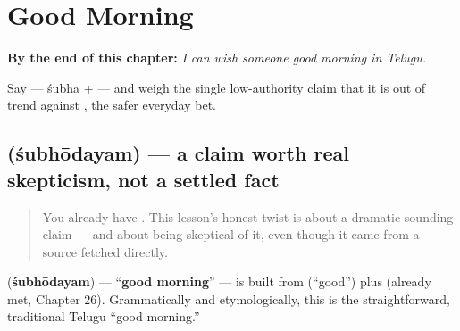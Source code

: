 
\chapter{Good Morning}
\label{ch:te-good-morning}

\begin{chapteropening}
\textbf{By the end of this chapter:} \emph{I can wish someone good morning in Telugu.}

Say  — śubha +  — and weigh the single low-authority claim that it is out of trend against , the safer everyday bet.
\end{chapteropening}

\section[\texorpdfstring{\te{శుభోదయం} (śubhōdayam)}{శుభోదయం (śubhōdayam)}]{ (śubhōdayam) — a claim worth real skepticism, not a settled fact}

\label{lesson:TE-C29-subhodayam}



\begin{quote}
You already have . This lesson's honest twist is about a dramatic-sounding claim — and about being skeptical of it, even though it came from a source fetched directly.
\end{quote}

\begin{cousinweb}
\textbf{} (\textbf{śubhōdayam}) — \textquotedblleft{}\textbf{good morning}\textquotedblright{} — is built from \textbf{} (\textquotedblleft{}good\textquotedblright{}) plus \textbf{} (already met, Chapter 26). Grammatically and etymologically, this is the straightforward, traditional Telugu \textquotedblleft{}good morning.\textquotedblright{}
\end{cousinweb}

